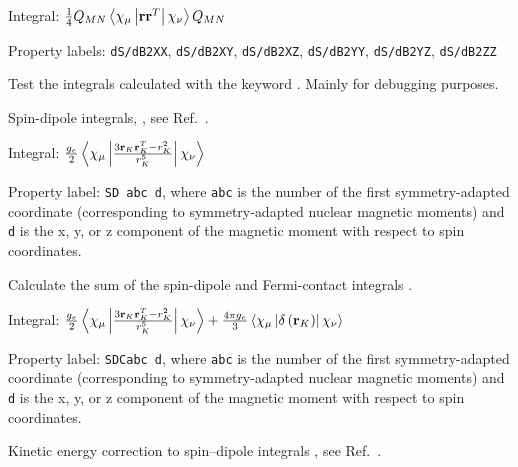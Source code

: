 \begin{description}
\begin{list}{}{}
\item Integral: $\frac{1}{4}Q_{MN}\left<\chi_{\mu}\left|{\bf r}{\bf
r}^{T}\right|\chi_{\nu}\right>Q_{MN}$
\item Property labels: \verb|dS/dB2XX|, \verb|dS/dB2XY|,
\verb|dS/dB2XZ|, \verb|dS/dB2YY|, \verb|dS/dB2YZ|, \verb|dS/dB2ZZ|
\end{list}

\item[\Key{S2MAGT}] Test the integrals calculated with the keyword
. Mainly for debugging purposes.

\item[\Key{SD}] Spin-dipole integrals,
,
see Ref.~\cite{ovhapjhjajsbpthjcp96}.

\begin{list}{}{}
\item Integral: $\frac{g_e}{2}\left<\chi_{\mu}\left|\frac{3{\bf
r}_K{\bf r}_K^T - r_K^2}{r_{K}^5}\right|\chi_{\nu}\right>$
\item Property label: \verb|SD abc d|, where \verb|abc| is the number
of the first symmetry-adapted coordinate (corresponding to
symmetry-adapted nuclear magnetic moments) and \verb|d| is the x, y,
or z component of the magnetic moment with respect to spin coordinates.
\end{list}

\item[\Key{SD+FC}] Calculate the sum of the spin-dipole and
Fermi-contact integrals
.

\begin{list}{}{}
\item Integral: $\frac{g_e}{2}\left<\chi_{\mu}\left|\frac{3{\bf
r}_K{\bf r}_K^T - r_K^2}{r_{K}^5}\right|\chi_{\nu}\right> + \frac{4\pi
g_e}{3}\left<\chi_{\mu}\left|\delta\left({\bf
r}_K\right)\right|\chi_{\nu}\right>$
\item Property label: \verb|SDCabc d|, where \verb|abc| is the number
of the first symmetry-adapted coordinate (corresponding to
symmetry-adapted nuclear magnetic moments) and \verb|d| is the x, y,
or z component of the magnetic moment with respect to spin coordinates.
\end{list}

\item[\Key{SD-KE}] Kinetic energy correction to spin--dipole integrals
,
see Ref.~\cite{pmpljvkrjcp119}.


\end{description}
